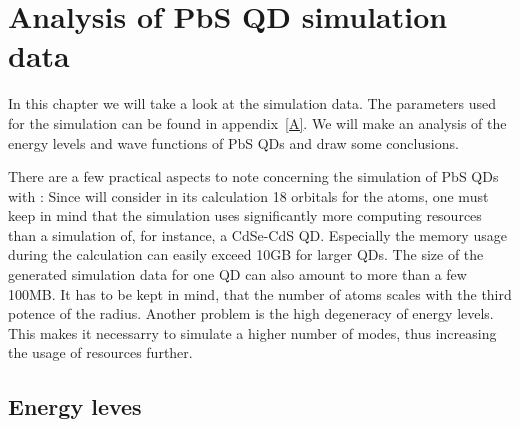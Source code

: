 \chapter{Analysis of PbS QD simulation data}

In this chapter we will take a look at the simulation data. The parameters used for the simulation can be found in appendix~\ref{A}. We will make an analysis of the energy levels and wave functions of PbS QDs and draw some conclusions.\\

\begin{REMARK} 
There are a few practical aspects to note concerning the simulation of PbS QDs with \omen: Since \omen will consider in its calculation 18 orbitals for the atoms, one must keep in mind that the simulation uses significantly more computing resources than a simulation of, for instance, a CdSe-CdS QD. Especially the memory usage during the calculation can easily exceed 10GB for larger QDs. The size of the generated simulation data for one QD can also amount to more than a few 100MB. It has to be kept in mind, that the number of atoms scales with the third potence of the radius. Another problem is the high degeneracy of energy levels. This makes it necessarry to simulate a higher number of modes, thus increasing the usage of resources further.
\end{REMARK}

\section{Energy leves}

